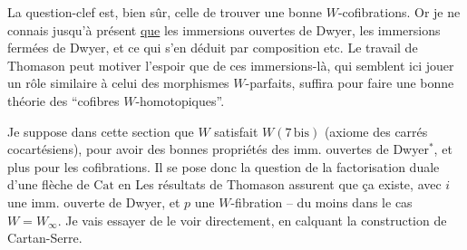 La question-clef est, bien sûr, celle de  trouver une bonne  $W$-cofibrations. Or je ne connais jusqu'à présent \uline{que} les immersions ouvertes de Dwyer, les immersions fermées de Dwyer, et ce qui s'en déduit par composition etc. Le travail de Thomason peut motiver l'espoir que  de ces immersions-là, qui semblent ici jouer un rôle similaire  à celui des morphismes $W$-parfaits, suffira pour faire une bonne théorie des  ``cofibres $W$-homotopiques''.

Je suppose dans  cette section que $W$ satisfait $W(7\,\mathrm{bis})$ (axiome des carrés cocartésiens), pour avoir des bonnes propriétés des imm. ouvertes de Dwyer$^{*}$, et plus  pour les cofibrations.
Il se pose donc la question de la factorisation duale d'une flèche  de $\mathrm{Cat}$ en
  Les résultats de Thomason assurent que ça existe, avec $i$ une imm. ouverte de Dwyer, et $p$ une $W$-fibration -- du moins dans le cas $W=W_\infty$. Je vais essayer de le voir directement, en calquant  la construction  de Cartan-Serre.

